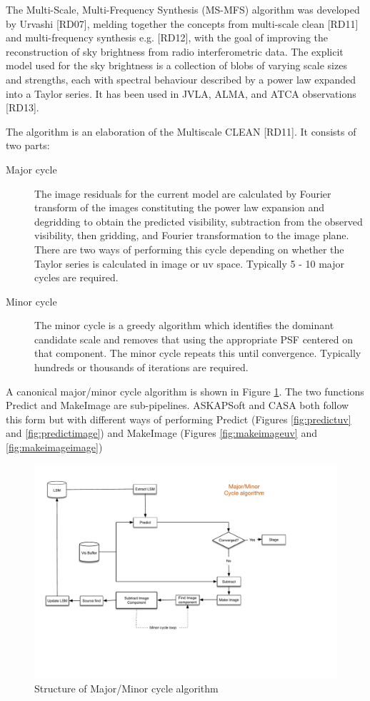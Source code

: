 \documentclass[11pt,a4paper,variablewidth]{article}
\begin{document}
The Multi-Scale, Multi-Frequency Synthesis (MS-MFS) algorithm was developed by Urvashi [RD07], melding together the concepts from multi-scale clean [RD11] and multi-frequency synthesis e.g. [RD12], with the goal of improving the reconstruction of sky brightness from radio interferometric data. The explicit model used for the sky brightness is a collection of blobs of varying scale sizes and strengths, each with spectral behaviour described by a power law expanded into a Taylor series. It has been used in JVLA, ALMA, and ATCA observations [RD13].

The algorithm is an elaboration of the Multiscale CLEAN [RD11]. It consists of two parts:
\begin{description}
\item[Major cycle] The image residuals for the current model are calculated by Fourier transform of the images constituting the power law expansion and degridding to obtain the predicted visibility, subtraction from the observed visibility, then gridding, and Fourier transformation to the image plane. There are two ways of performing this cycle depending on whether the Taylor series is calculated in image or uv space. Typically 5 - 10 major cycles are required.
\item[Minor cycle] The minor cycle is a greedy algorithm which identifies the dominant candidate scale and removes that using the appropriate PSF centered on that component. The minor cycle repeats this until convergence. Typically hundreds or thousands of iterations are required.
\end{description}

A canonical major/minor cycle algorithm is shown in Figure \ref{fig:majorminor}. The two functions Predict and MakeImage are sub-pipelines. ASKAPSoft and CASA both follow this form but with different ways of performing Predict (Figures \ref{fig:predictuv} and \ref{fig:predictimage}) and MakeImage (Figures \ref{fig:makeimageuv} and \ref{fig:makeimageimage})

\begin{figure}[htb]
  \centering
  \includegraphics[width=\textwidth]{./MSMFS_MajorMinor.pdf}
  \caption{Structure of Major/Minor cycle algorithm}
  \label{fig:majorminor}
\end{figure}
\end{document}

